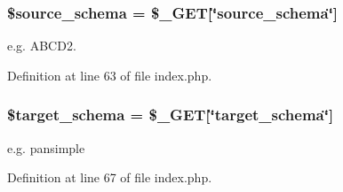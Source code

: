\subsubsection[{\texorpdfstring{\$source\+\_\+schema}{$source_schema}}]{\setlength{\rightskip}{0pt plus 5cm}\$source\+\_\+schema = \$\+\_\+\+G\+ET\mbox{[}\char`\"{}source\+\_\+schema\char`\"{}\mbox{]}}\hypertarget{namespace_consistency_ae760b4b690dd68b19e3624cdaddb5ad1}{}\label{namespace_consistency_ae760b4b690dd68b19e3624cdaddb5ad1}
e.\+g. A\+B\+C\+D2. 

Definition at line 63 of file index.\+php.

\subsubsection[{\texorpdfstring{\$target\+\_\+schema}{$target_schema}}]{\setlength{\rightskip}{0pt plus 5cm}\$target\+\_\+schema = \$\+\_\+\+G\+ET\mbox{[}\char`\"{}target\+\_\+schema\char`\"{}\mbox{]}}\hypertarget{namespace_consistency_a43945d5f5c2b8601a121f40a2db7b5b2}{}\label{namespace_consistency_a43945d5f5c2b8601a121f40a2db7b5b2}
e.\+g. pansimple 

Definition at line 67 of file index.\+php.

